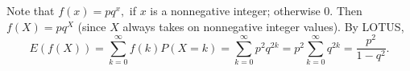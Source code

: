 
\setcounter{theorem}{28}
\begin{exercise} [BH.4.29]
\begin{solution}
    Note that $f(x)=p q^x,$  { if } $x$   { is a nonnegative integer; } otherwise 0.
	Then $f(X)=p q^X$ (since $X$ always takes on nonnegative integer values). By LOTUS,
	$$
	E(f(X))=\sum_{k=0}^{\infty} f(k) P(X=k)=\sum_{k=0}^{\infty} p^2 q^{2 k}=p^2 \sum_{k=0}^{\infty} q^{2 k}= \frac{p^2}{1-q^2}.
	$$
\end{solution}
\end{exercise}

